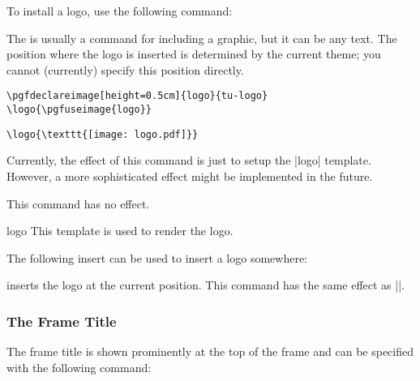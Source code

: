 To install a logo, use the following command:

\begin{command}{\logo{}}
  The  is usually a command for including a graphic, but it can be any text. The position where the logo is inserted is determined by the current theme; you cannot (currently) specify this position directly.

  \example
\begin{verbatim}
\pgfdeclareimage[height=0.5cm]{logo}{tu-logo}
\logo{\pgfuseimage{logo}}
\end{verbatim}

  \example
\begin{verbatim}
\logo{\texttt{[image: logo.pdf]}}
\end{verbatim}

  Currently, the effect of this command is just to setup the |logo| template. However, a more sophisticated effect might be implemented in the future.

  \articlenote
  This command has no effect.

  \begin{element}{logo}\yes\yes\yes
    This template is used to render the logo.
  \end{element}

  The following insert can be used to insert a logo somewhere:
  \begin{itemize}
    \iteminsert{\insertlogo}
    inserts the logo at the current position. This command has the same effect as ||.
  \end{itemize}
\end{command}

\subsubsection{The Frame Title}

The frame title is shown prominently at the top of the frame and can be specified with the following command:

